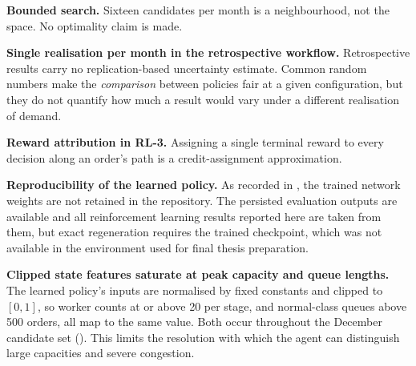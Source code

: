 \textbf{Bounded search.} Sixteen candidates per month is a neighbourhood, not the space. No
optimality claim is made.

\textbf{Single realisation per month in the retrospective workflow.} Retrospective results
carry no replication-based uncertainty estimate. Common random numbers make the
\emph{comparison} between policies fair at a given configuration, but they do not quantify how
much a result would vary under a different realisation of demand.

\textbf{Reward attribution in RL-3.} Assigning a single terminal reward to every decision along
an order's path is a credit-assignment approximation.

\textbf{Reproducibility of the learned policy.} As recorded in , the trained network
weights are not retained in the repository. The persisted evaluation outputs are available and
all reinforcement learning results reported here are taken from them, but exact regeneration
requires the trained checkpoint, which was not available in the environment used for final
thesis preparation.

\textbf{Clipped state features saturate at peak capacity and queue lengths.} The learned
policy's inputs are normalised by fixed constants and clipped to \([0,1]\), so worker counts at
or above 20 per stage, and normal-class queues above 500 orders, all map to the same value.
Both occur throughout the December candidate set (). This limits the
resolution with which the agent can distinguish large capacities and severe congestion.
